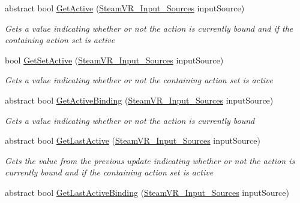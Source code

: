 \begin{DoxyCompactItemize}
abstract bool \mbox{\hyperlink{class_valve_1_1_v_r_1_1_steam_v_r___action_a22690e2467a2d5b78b495f7fcdd5666b}{Get\+Active}} (\mbox{\hyperlink{namespace_valve_1_1_v_r_a82e5bf501cc3aa155444ee3f0662853f}{Steam\+V\+R\+\_\+\+Input\+\_\+\+Sources}} input\+Source)
\begin{DoxyCompactList}\small\item\em Gets a value indicating whether or not the action is currently bound and if the containing action set is active \end{DoxyCompactList}\item 
bool \mbox{\hyperlink{class_valve_1_1_v_r_1_1_steam_v_r___action_a78c588d2687e397766adb5f004e3597d}{Get\+Set\+Active}} (\mbox{\hyperlink{namespace_valve_1_1_v_r_a82e5bf501cc3aa155444ee3f0662853f}{Steam\+V\+R\+\_\+\+Input\+\_\+\+Sources}} input\+Source)
\begin{DoxyCompactList}\small\item\em Gets a value indicating whether or not the containing action set is active \end{DoxyCompactList}\item 
abstract bool \mbox{\hyperlink{class_valve_1_1_v_r_1_1_steam_v_r___action_a86d2eae9b5b28ea8eec464abf7ea53bb}{Get\+Active\+Binding}} (\mbox{\hyperlink{namespace_valve_1_1_v_r_a82e5bf501cc3aa155444ee3f0662853f}{Steam\+V\+R\+\_\+\+Input\+\_\+\+Sources}} input\+Source)
\begin{DoxyCompactList}\small\item\em Gets a value indicating whether or not the action is currently bound \end{DoxyCompactList}\item 
abstract bool \mbox{\hyperlink{class_valve_1_1_v_r_1_1_steam_v_r___action_a33092fe773f3dd669be8cb019a1dffa4}{Get\+Last\+Active}} (\mbox{\hyperlink{namespace_valve_1_1_v_r_a82e5bf501cc3aa155444ee3f0662853f}{Steam\+V\+R\+\_\+\+Input\+\_\+\+Sources}} input\+Source)
\begin{DoxyCompactList}\small\item\em Gets the value from the previous update indicating whether or not the action is currently bound and if the containing action set is active \end{DoxyCompactList}\item 
abstract bool \mbox{\hyperlink{class_valve_1_1_v_r_1_1_steam_v_r___action_ab3f5864e5b4baaf02de9ab7eb77ba4d0}{Get\+Last\+Active\+Binding}} (\mbox{\hyperlink{namespace_valve_1_1_v_r_a82e5bf501cc3aa155444ee3f0662853f}{Steam\+V\+R\+\_\+\+Input\+\_\+\+Sources}} input\+Source)

\end{DoxyCompactItemize}
